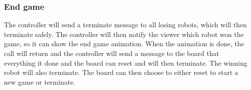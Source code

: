 	

	\subsubsection{End game}
	The controller will send a terminate message to all losing robots, which will then terminate safely. The controller will then notify the viewer which robot won the game, so it can show the end game animation. When the animation is done, the call will return and the controller will send a message to the board that everything it done and the board can reset and will then terminate. The winning robot will also terminate. The board can then choose to either reset to start a new game or terminate.

	
